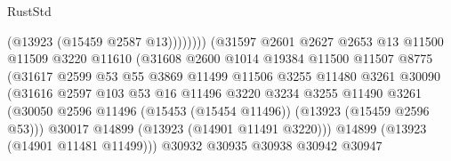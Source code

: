 \begin{lexlean}{RustStd}
\begin{coremodule}
                                              (@13923 (@15459 @2587 @13))))))))
                                  (@31597
                                    @2601
                                    @2627
                                    @2653
                                    @13
                                    @11500
                                    @11509
                                    @3220
                                    @11610
                                    (@31608
                                      @2600
                                      @1014
                                      @19384
                                      @11500
                                      @11507
                                      @8775
                                      (@31617
                                        @2599
                                        @53
                                        @55
                                        @3869
                                        @11499
                                        @11506
                                        @3255
                                        @11480
                                        @3261
                                        @30090
                                        (@31616
                                          @2597
                                          @103
                                          @53
                                          @16
                                          @11496
                                          @3220
                                          @3234
                                          @3255
                                          @11490
                                          @3261
                                          (@30050
                                            @2596
                                            @11496
                                            (@15453 (@15454 @11496))
                                            (@13923 (@15459 @2596 @53)))
                                          @30017
                                          @14899
                                          (@13923 (@14901 @11491 @3220)))
                                        @14899
                                        (@13923 (@14901 @11481 @11499)))
                                      @30932
                                      @30935
                                      @30938
                                      @30942
                                      @30947

\end{coremodule}
\end{lexlean}
